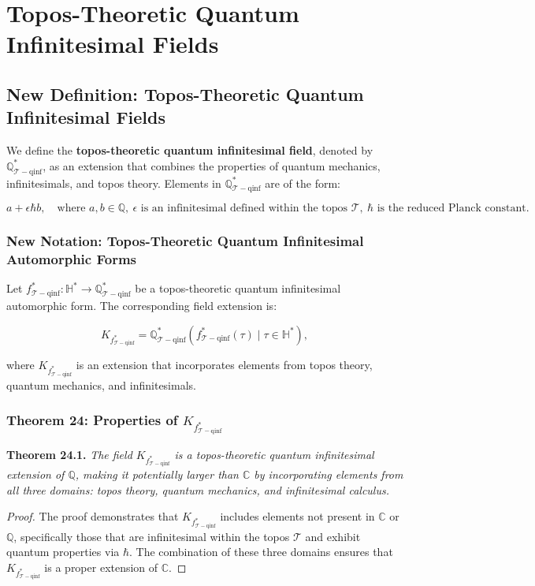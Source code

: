 \documentclass{article}
\begin{document}
\section{Topos-Theoretic Quantum Infinitesimal Fields}
\subsection{New Definition: Topos-Theoretic Quantum Infinitesimal Fields}
We define the \textbf{topos-theoretic quantum infinitesimal field}, denoted by \(\mathbb{Q}_{\mathcal{T}-\text{qinf}}^*\), as an extension that combines the properties of quantum mechanics, infinitesimals, and topos theory. Elements in \(\mathbb{Q}_{\mathcal{T}-\text{qinf}}^*\) are of the form:

\[
a + \epsilon \hbar b, \quad \text{where } a, b \in \mathbb{Q}, \ \epsilon \text{ is an infinitesimal defined within the topos } \mathcal{T}, \ \hbar \text{ is the reduced Planck constant}.
\]

\subsubsection{New Notation: Topos-Theoretic Quantum Infinitesimal Automorphic Forms}
Let \(f_{\mathcal{T}-\text{qinf}}^*: \mathbb{H}^* \to \mathbb{Q}_{\mathcal{T}-\text{qinf}}^*\) be a topos-theoretic quantum infinitesimal automorphic form. The corresponding field extension is:

\[
K_{f_{\mathcal{T}-\text{qinf}}^*} = \mathbb{Q}_{\mathcal{T}-\text{qinf}}^*(f_{\mathcal{T}-\text{qinf}}^*(\tau) \mid \tau \in \mathbb{H}^*),
\]

where \(K_{f_{\mathcal{T}-\text{qinf}}^*}\) is an extension that incorporates elements from topos theory, quantum mechanics, and infinitesimals.

\subsubsection{Theorem 24: Properties of \(K_{f_{\mathcal{T}-\text{qinf}}^*}\)}
\textbf{Theorem 24.1.} \textit{The field \(K_{f_{\mathcal{T}-\text{qinf}}^*}\) is a topos-theoretic quantum infinitesimal extension of \(\mathbb{Q}\), making it potentially larger than \(\mathbb{C}\) by incorporating elements from all three domains: topos theory, quantum mechanics, and infinitesimal calculus.}

\begin{proof}
The proof demonstrates that \(K_{f_{\mathcal{T}-\text{qinf}}^*}\) includes elements not present in \(\mathbb{C}\) or \(\mathbb{Q}\), specifically those that are infinitesimal within the topos \(\mathcal{T}\) and exhibit quantum properties via \(\hbar\). The combination of these three domains ensures that \(K_{f_{\mathcal{T}-\text{qinf}}^*}\) is a proper extension of \(\mathbb{C}\).
\end{proof}
\end{document}
